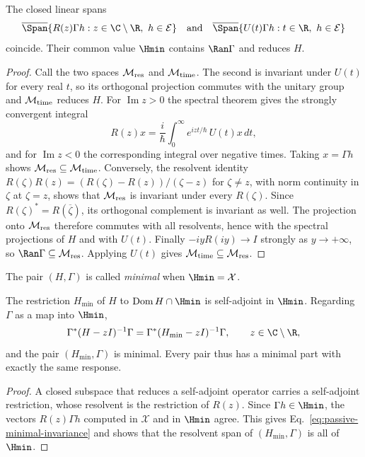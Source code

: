 \begin{proposition}
\label{prop:passive-two-spans}
The closed linear spans
\[
 \overline{\Span}\{R(z)\Gamma h:z\in\C\setminus\R,\ h\in\mathcal E\}
 \quad\text{and}\quad
 \overline{\Span}\{U(t)\Gamma h:t\in\R,\ h\in\mathcal E\}
\]
coincide. Their common value $\Hmin$ contains $\Ran\Gamma$ and reduces $H$.
\end{proposition}
\begin{proof}
Call the two spaces $\mathcal M_{\rm res}$ and $\mathcal M_{\rm time}$. The second is invariant under $U(t)$ for every real $t$, so its orthogonal projection commutes with the unitary group and $\mathcal M_{\rm time}$ reduces $H$. For $\operatorname{Im}z>0$ the spectral theorem gives the strongly convergent integral
\[
 R(z)x=\frac{i}{\hbar}\int_0^\infty e^{izt/\hbar}\,U(t)x\,dt ,
\]
and for $\operatorname{Im}z<0$ the corresponding integral over negative times. Taking $x=\Gamma h$ shows $\mathcal M_{\rm res}\subseteq\mathcal M_{\rm time}$. Conversely, the resolvent identity $R(\zeta)R(z)=(R(\zeta)-R(z))/(\zeta-z)$ for $\zeta\ne z$, with norm continuity in $\zeta$ at $\zeta=z$, shows that $\mathcal M_{\rm res}$ is invariant under every $R(\zeta)$. Since $R(\zeta)^*=R(\overline\zeta)$, its orthogonal complement is invariant as well. The projection onto $\mathcal M_{\rm res}$ therefore commutes with all resolvents, hence with the spectral projections of $H$ and with $U(t)$. Finally $-iyR(iy)\to I$ strongly as $y\to+\infty$, so $\Ran\Gamma\subseteq\mathcal M_{\rm res}$. Applying $U(t)$ gives $\mathcal M_{\rm time}\subseteq\mathcal M_{\rm res}$.
\end{proof}

The pair $(H,\Gamma)$ is called \emph{minimal} when $\Hmin=\mathcal X$.

\begin{proposition}
\label{prop:passive-minimal-reduction}
The restriction $H_{\min}$ of $H$ to $\operatorname{Dom}H\cap\Hmin$ is self-adjoint in $\Hmin$. Regarding $\Gamma$ as a map into $\Hmin$,
\begin{equation}
 \Gamma^*(H-zI)^{-1}\Gamma=\Gamma^*(H_{\min}-zI)^{-1}\Gamma ,\qquad z\in\C\setminus\R ,
 \label{eq:passive-minimal-invariance}
\end{equation}
and the pair $(H_{\min},\Gamma)$ is minimal. Every pair thus has a minimal part with exactly the same response.
\end{proposition}
\begin{proof}
A closed subspace that reduces a self-adjoint operator carries a self-adjoint restriction, whose resolvent is the restriction of $R(z)$. Since $\Gamma h\in\Hmin$, the vectors $R(z)\Gamma h$ computed in $\mathcal X$ and in $\Hmin$ agree. This gives Eq.~\eqref{eq:passive-minimal-invariance} and shows that the resolvent span of $(H_{\min},\Gamma)$ is all of $\Hmin$.
\end{proof}

